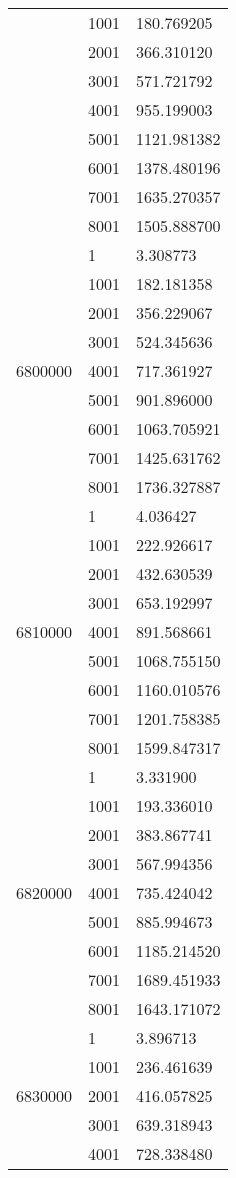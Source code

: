 \begin{table}[htb!]
\begin{tabular}{lll}
 & 1001 & 180.769205 \\
 & 2001 & 366.310120 \\
 & 3001 & 571.721792 \\
 & 4001 & 955.199003 \\
 & 5001 & 1121.981382 \\
 & 6001 & 1378.480196 \\
 & 7001 & 1635.270357 \\
 & 8001 & 1505.888700 \\
\multirow[c]{9}{*}{6800000} & 1 & 3.308773 \\
 & 1001 & 182.181358 \\
 & 2001 & 356.229067 \\
 & 3001 & 524.345636 \\
 & 4001 & 717.361927 \\
 & 5001 & 901.896000 \\
 & 6001 & 1063.705921 \\
 & 7001 & 1425.631762 \\
 & 8001 & 1736.327887 \\
\multirow[c]{9}{*}{6810000} & 1 & 4.036427 \\
 & 1001 & 222.926617 \\
 & 2001 & 432.630539 \\
 & 3001 & 653.192997 \\
 & 4001 & 891.568661 \\
 & 5001 & 1068.755150 \\
 & 6001 & 1160.010576 \\
 & 7001 & 1201.758385 \\
 & 8001 & 1599.847317 \\
\multirow[c]{9}{*}{6820000} & 1 & 3.331900 \\
 & 1001 & 193.336010 \\
 & 2001 & 383.867741 \\
 & 3001 & 567.994356 \\
 & 4001 & 735.424042 \\
 & 5001 & 885.994673 \\
 & 6001 & 1185.214520 \\
 & 7001 & 1689.451933 \\
 & 8001 & 1643.171072 \\
\multirow[c]{9}{*}{6830000} & 1 & 3.896713 \\
 & 1001 & 236.461639 \\
 & 2001 & 416.057825 \\
 & 3001 & 639.318943 \\
 & 4001 & 728.338480 \\

\end{tabular}
\end{table}
